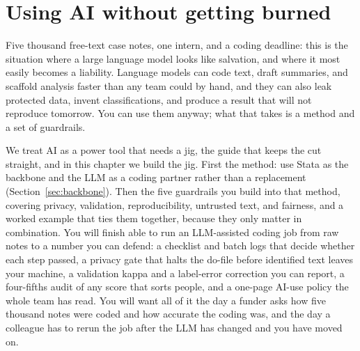 \documentclass[
    a4paper,
    fontsize=10pt,
    twoside=true,
    numbers=noenddot,
]{kaobook}
\begin{document}


\chapter{Using AI without getting burned}\label{ch:ai}

Five thousand free-text case notes, one intern, and a coding deadline: this is the situation where a large language model looks like salvation, and where it most easily becomes a liability. Language models can code text, draft summaries, and scaffold analysis faster than any team could by hand, and they can also leak protected data, invent classifications, and produce a result that will not reproduce tomorrow. You can use them anyway; what that takes is a method and a set of guardrails.

We treat AI as a power tool that needs a jig, the guide that keeps the cut straight, and in this chapter we build the jig. First the method: use Stata as the backbone and the LLM as a coding partner rather than a replacement (Section~\ref{sec:backbone}). Then the five guardrails you build into that method, covering privacy, validation, reproducibility, untrusted text, and fairness, and a worked example that ties them together, because they only matter in combination. You will finish able to run an LLM-assisted coding job from raw notes to a number you can defend: a checklist and batch logs that decide whether each step passed, a privacy gate that halts the do-file before identified text leaves your machine, a validation kappa and a label-error correction you can report, a four-fifths audit of any score that sorts people, and a one-page AI-use policy the whole team has read. You will want all of it the day a funder asks how five thousand notes were coded and how accurate the coding was, and the day a colleague has to rerun the job after the LLM has changed and you have moved on.
\end{document}
